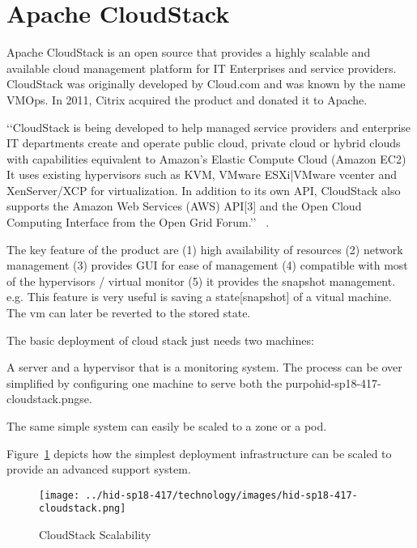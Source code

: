 
\section{Apache CloudStack}

Apache CloudStack is an open source that provides a highly scalable
and available cloud management platform for IT Enterprises and service
providers. CloudStack was originally developed by Cloud.com and was
known by the name VMOps.  In 2011, Citrix acquired the product and
donated it to Apache.

‘‘CloudStack is being developed to help managed service providers and
enterprise IT departments create and operate public cloud, private
cloud or hybrid clouds with capabilities equivalent to Amazon's
Elastic Compute Cloud (Amazon EC2) It uses existing hypervisors such
as KVM, VMware ESXi|VMware vcenter and XenServer/XCP for
virtualization. In addition to its own API, CloudStack also supports
the Amazon Web Services (AWS) API[3] and the Open Cloud Computing
Interface from the Open Grid Forum.’’  ~\cite{
  hid-sp18-417-wiki-cloudStack}.

The key feature of the product are 
(1) high availability of resources
(2) network management
(3) provides GUI for ease of management
(4) compatible with most of the hypervisors / virtual monitor
(5) it provides the snapshot management. e.g. This feature is 
very useful is saving a state[snapshot] of a vitual machine. 
The vm can later be reverted to the stored state.  

The basic deployment of cloud stack just needs two machines: 
 
A server and a hypervisor that is a monitoring system.  The process
can be over simplified by configuring one machine to serve both the
purpohid-sp18-417-cloudstack.pngse.
 
The same simple system can easily be scaled to a zone or a pod.

Figure~\ref{F:cloudstack-scalabuility} depicts how the simplest
deployment infrastructure can be scaled to provide an advanced support
system.

\begin{figure}[htb]
  \texttt{[image: ../hid-sp18-417/technology/images/hid-sp18-417-cloudstack.png]}
  \caption{CloudStack Scalability ~\cite{hid-sp18-417-cloudstack-scaling}}
  \label{F:cloudstack-scalabuility}
\end{figure}


